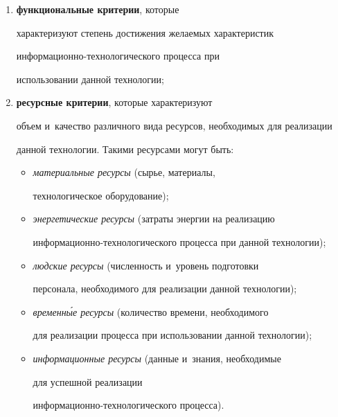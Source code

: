    \begin{enumerate}[(1)]


   \item \textbf{функциональные критерии}, которые 


характеризуют степень достижения же\-ла\-емых характеристик  


ин\-фор\-ма\-ци\-он\-но-тех\-но\-ло\-ги\-че\-ско\-го процесса при 


использовании данной технологии; 


   \item \textbf{ресурсные критерии}, которые характеризуют 


объем и~качество различного вида ресурсов, необходимых для реализации 


данной технологии. Такими ресурсами могут быть:


   \begin{itemize}


   \item \textit{материальные ресурсы} (сырье, материалы, 


технологическое оборудование);


   \item \textit{энергетические ресурсы} (за\-тра\-ты энергии на реализацию 


ин\-фор\-ма\-ци\-он\-но-тех\-но\-ло\-ги\-че\-ско\-го процесса при данной технологии);


   \item \textit{людские ресурсы} (чис\-лен\-ность и~уровень под\-го\-тов\-ки 


персонала, необходимого для реализации данной технологии);


   \item \textit{временн\'{ы}е ресурсы} (количество времени, необходимого 


для реализации процесса при использовании данной технологии);


   \item \textit{информационные ресурсы} (данные и~знания, необходимые 


для успеш\-ной реализации  


ин\-фор\-ма\-ци\-он\-но-тех\-но\-ло\-ги\-че\-ско\-го процесса). 


   \end{itemize}


   \end{enumerate}


   


